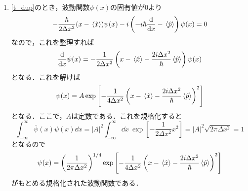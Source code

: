 \documentclass[a4paper,pdflatex,ja=standard]{bxjsarticle}
\begin{document}
\begin{enumerate}
  \item 
  \eqref{t_dup}のとき，波動関数$\psi(x)$の固有値が$0$より
  \begin{equation}
    -\frac{\hbar}{2\Delta x^2}
    (x-\ev*{\hat{x}})\psi(x)
    -i
    \left(  
      -i\hbar\dv{}{x}-\ev*{\hat{p}}
    \right)
    \psi(x)
    =
    0
  \end{equation}  
  なので，これを整理すれば
  \begin{equation}
    \dv{}{x}\psi(x)
    =
    -\frac{1}{2\Delta x^2}
    \left( 
      x-\ev*{\hat{x}}-\frac{2i\Delta x^2}{\hbar}\ev*{\hat{p}}
    \right)\psi(x)
  \end{equation}
  となる．これを解けば
  \begin{equation}
    \psi(x)
    =
    A \exp\left[ -\frac{1}{4\Delta x^2}
    \left( 
      x-\ev*{\hat{x}}-\frac{2i\Delta x^2}{\hbar}\ev*{\hat{p}}
    \right)^2 \right]
  \end{equation}
  となる．ここで，$A$は定数である．これを規格化すると
  \begin{equation}
    \int_{-\infty}^{\infty}
    \overline{\psi}(x)\psi(x)\dd x
    =
    |A|^2
    \int_{-\infty}^{\infty}\dd x\ 
    \exp\left[ -\frac{1}{2\Delta x^2}x^2 \right]
    =
    |A|^2\sqrt{2\pi\Delta x^2}
    =
    1
  \end{equation}
  となるので
  \begin{equation}
    \psi(x)
    =
    \left( \frac{1}{2\pi\Delta x^2} \right)^{1/4}
    \exp\left[ -\frac{1}{4\Delta x^2}
    \left( 
      x-\ev*{\hat{x}}-\frac{2i\Delta x^2}{\hbar}\ev*{\hat{p}}
    \right)^2 \right]
  \end{equation}
  がもとめる規格化された波動関数である．
\end{enumerate}
\end{document}
